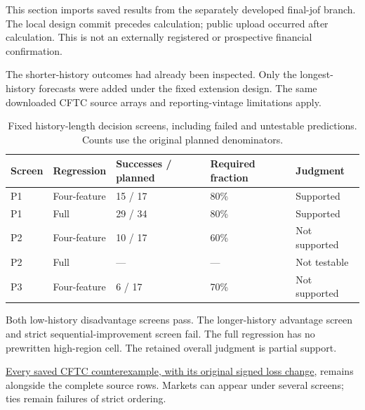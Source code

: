 \documentclass[10pt,a4paper]{article}
\begin{document}
This section imports saved results from the separately developed final-jof branch. The local design commit precedes calculation; public upload occurred after calculation. This is not an externally registered or prospective financial confirmation.

The shorter-history outcomes had already been inspected. Only the longest-history forecasts were added under the fixed extension design. The same downloaded CFTC source arrays and reporting-vintage limitations apply.

\begin{table}[htbp]\centering\small

\caption{Fixed history-length decision screens, including failed and untestable predictions. Counts use the original planned denominators.}\label{tab:submission-wp2}

\begin{tabular}{lllll}\toprule

Screen & Regression & Successes / planned & Required fraction & Judgment\\\midrule

P1 & Four-feature & 15 / 17 & 80\% & Supported\\

P1 & Full & 29 / 34 & 80\% & Supported\\

P2 & Four-feature & 10 / 17 & 60\% & Not supported\\

P2 & Full & --- & --- & Not testable\\

P3 & Four-feature & 6 / 17 & 70\% & Not supported\\

\bottomrule\end{tabular}\end{table}

Both low-history disadvantage screens pass. The longer-history advantage screen and strict sequential-improvement screen fail. The full regression has no prewritten high-region cell. The retained overall judgment is partial support.

\href{https://github.com/ByronLi0207/financial-mathematics-paper-20261020/blob/submission-final/EXTENDED_RESULTS.md#asmbi-extended-s39}{Every saved CFTC counterexample, with its original signed loss change}, remains alongside the complete source rows. Markets can appear under several screens; ties remain failures of strict ordering.

\FloatBarrier
\end{document}
